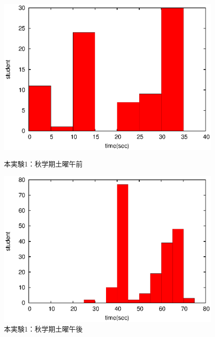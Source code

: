 \documentclass[a4paper,10pt]{jarticle}
\begin{document}
\begin{figure}[htpb]                        
\begin{minipage} {0.5\hsize}                             
\begin{center}                              
\includegraphics[bb=0 0 390 248,clip,width=\hsize]{xSa12_hist.eps}   
\caption{本実験1：秋学期土曜午前}                              
\label{xSa12}                                
\end{center}                                    
\end{minipage}                                 
\begin{minipage}{0.5\hsize}                                            
\begin{center}                              
\includegraphics[bb=0 0 390 248,clip,width=\hsize]{xSa345_hist.eps}   
\caption{本実験1：秋学期土曜午後}                              
\label{xSa345}                                
\end{center}                                    
\end{minipage}                                 
\end{figure}                                 


\end{document}
